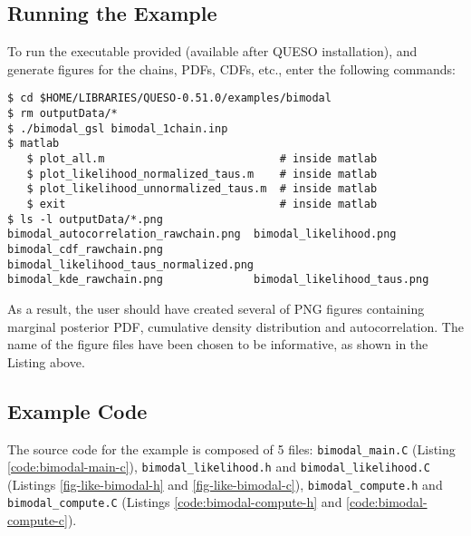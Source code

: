 \subsection{Running the Example}\label{sec:bimodal-run}

To run the executable provided (available after QUESO installation), and generate figures for the chains, PDFs, CDFs, etc., enter the following commands:
\begin{lstlisting}[label={},caption={}]
$ cd $HOME/LIBRARIES/QUESO-0.51.0/examples/bimodal
$ rm outputData/*
$ ./bimodal_gsl bimodal_1chain.inp    
$ matlab
   $ plot_all.m	                          # inside matlab
   $ plot_likelihood_normalized_taus.m    # inside matlab
   $ plot_likelihood_unnormalized_taus.m  # inside matlab
   $ exit                                 # inside matlab
$ ls -l outputData/*.png
bimodal_autocorrelation_rawchain.png  bimodal_likelihood.png
bimodal_cdf_rawchain.png	          bimodal_likelihood_taus_normalized.png
bimodal_kde_rawchain.png	          bimodal_likelihood_taus.png
\end{lstlisting}


As a result, the user should have created several of PNG figures containing marginal posterior PDF, cumulative density distribution and autocorrelation. The name of the figure files have been chosen to be informative, as shown in the Listing above.




\subsection{Example Code}\label{sec:bimodal-code}

The source code for the example is composed of 5 files:
\texttt{bimodal\_main.C} (Listing \ref{code:bimodal-main-c}), \linebreak
\texttt{bimodal\_likelihood.h} and \texttt{bimodal\_likelihood.C} (Listings \ref{fig-like-bimodal-h} and \ref{fig-like-bimodal-c}),
\texttt{bimodal\_compute.h} and \texttt{bimodal\_compute.C} (Listings \ref{code:bimodal-compute-h} and \ref{code:bimodal-compute-c}).






